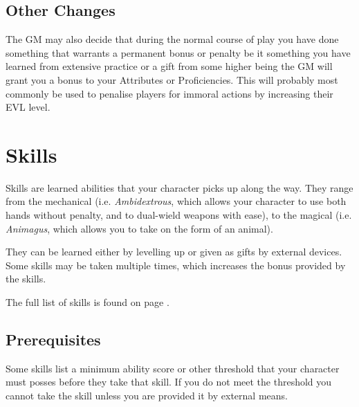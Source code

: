 \subsection{Other Changes}

The GM may also decide that\comma{} during the normal course of play\comma{} you have done something that warrants a permanent bonus or penalty \minus{}\minus{} be it something you have learned from extensive practice\comma{} or a gift from some higher being \minus{}\minus{} the GM will grant you a bonus to your Attributes or Proficiencies. This will probably most commonly be used to penalise players for immoral actions \minus{}\minus{} by increasing their EVL level.

\section{Skills}\label{S:Skills}

Skills are learned abilities that your character picks up along the way. They range from the mechanical (i.e. {\it Ambidextrous}, which allows your character to use both hands without penalty, and to dual-wield weapons with ease), to the magical (i.e. {\it Animagus}, which allows you to take on the form of an animal).


They can be learned either by levelling up or given as gifts by external devices. Some skills may be taken multiple times, which increases the bonus provided by the skills. 

The full list of skills is found on page \pageref{S:SkillList}.

\subsection{Prerequisites}

Some skills list a minimum ability score\comma{} or other threshold that your character must posses before they take that skill. If you do not meet the threshold\comma{} you cannot take the skill\comma{} unless you are provided it by external means.


